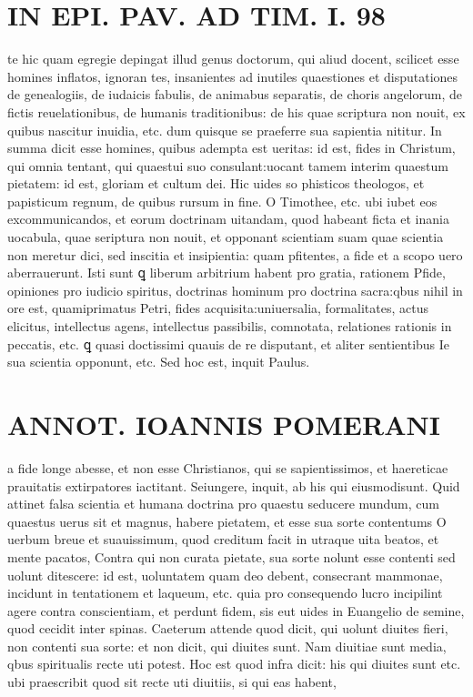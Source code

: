 \documentclass{article}
\begin{document}
\begin{pages}
\section*{IN EPI. PAV. AD TIM. I. 98 }
\marginpar{[ p.98 ]}\pstart te hic quam egregie depingat illud genus doctorum, qui aliud docent, scilicet esse homines inflatos, ignoran tes, insanientes ad inutiles quaestiones et disputationes de genealogiis, de iudaicis fabulis, de animabus separatis, de choris angelorum, de fictis reuelationibus, de humanis traditionibus: de his quae scriptura non nouit, ex quibus nascitur inuidia, etc. dum quisque se praeferre sua sapientia nititur. In summa dicit esse homines, quibus adempta est ueritas: id est, fides in Christum, qui omnia tentant, qui quaestui suo consulant:uocant tamem interim quaestum pietatem: id est, gloriam et cultum dei. Hic uides so phisticos theologos, et papisticum regnum, de quibus rursum in fine. O Timothee, etc. ubi iubet eos excommunicandos, et eorum doctrinam uitandam, quod habeant ficta et inania uocabula, quae seriptura non nouit, et opponant scientiam suam quae scientia non meretur dici, sed inscitia et insipientia: quam pfitentes, a fide et a scopo uero aberrauerunt. Isti sunt ꝗ liberum arbitrium habent pro gratia, rationem Pfide, opiniones pro iudicio spiritus, doctrinas hominum pro doctrina sacra:qbus nihil in ore est, quamiprimatus Petri, fides acquisita:uniuersalia, formalitates, actus elicitus, intellectus agens, intellectus passibilis, comnotata, relationes rationis in peccatis, etc. ꝗ quasi doctissimi quauis de re disputant, et aliter sentientibus Ie sua scientia opponunt, etc. Sed hoc est, inquit Paulus.  \pend
\section*{ANNOT. IOANNIS POMERANI }\pstart a fide longe abesse, et non esse Christianos, qui se sapientissimos, et haereticae prauitatis extirpatores iactitant. Seiungere, inquit, ab his qui eiusmodisunt.  \pend\pstart Quid attinet falsa scientia et humana doctrina pro quaestu seducere mundum, cum quaestus uerus sit et magnus, habere pietatem, et esse sua sorte contentums O uerbum breue et suauissimum, quod creditum facit in utraque uita beatos, et mente pacatos, Contra qui non curata pietate, sua sorte nolunt esse contenti sed uolunt ditescere: id est, uoluntatem quam deo debent, consecrant mammonae, incidunt in tentationem et laqueum, etc. quia pro consequendo lucro incipilint agere contra conscientiam, et perdunt fidem, sis eut uides in Euangelio de semine, quod cecidit inter spinas. Caeterum attende quod dicit, qui uolunt diuites fieri, non contenti sua sorte: et non dicit, qui diuites sunt. Nam diuitiae sunt media, qbus spiritualis recte uti potest. Hoc est quod infra dicit: his qui diuites sunt etc. ubi praescribit quod sit recte uti diuitiis, si qui eas habent,  \pend
{}
{}

\end{pages}
\end{document}
